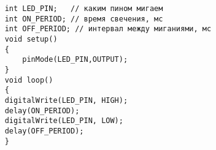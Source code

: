 \codeExample

\begin{verbatim}
    int LED_PIN;   // каким пином мигаем
    int ON_PERIOD; // время свечения, мс
    int OFF_PERIOD; // интервал между миганиями, мс
    void setup()
    {
        pinMode(LED_PIN,OUTPUT);
    }
    void loop()
    {
    digitalWrite(LED_PIN, HIGH); 
    delay(ON_PERIOD);                     
    digitalWrite(LED_PIN, LOW);  
    delay(OFF_PERIOD);                     
    }
\end{verbatim}